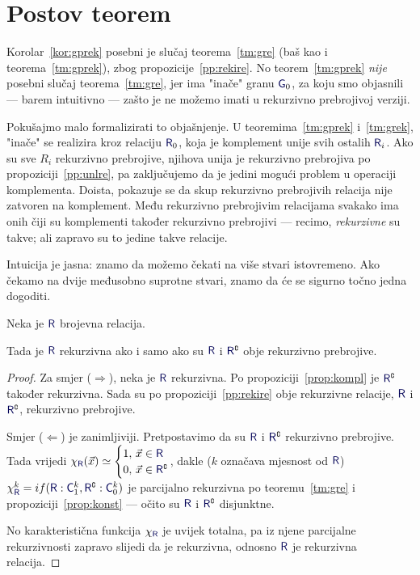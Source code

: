 \section{Postov teorem}\label{sec:Post}

Korolar~\ref{kor:gprek} posebni je slučaj teorema~\ref{tm:gre} (baš kao i teorema~\ref{tm:gprek}), zbog propozicije~\ref{pp:rekire}. No teorem~\ref{tm:gprek} \emph{nije} posebni slučaj teorema~\ref{tm:gre}, jer ima "inače" granu $\f G_0$, za koju smo objasnili --- barem intuitivno --- zašto je ne možemo imati u rekurzivno prebrojivoj verziji.

Pokušajmo malo formalizirati to objašnjenje. U teoremima~\ref{tm:gprek} i~\ref{tm:grek}, "inače" se realizira kroz relaciju $\f R_0$, koja je komplement unije svih ostalih $\f R_i$. Ako su sve $R_i$ rekurzivno prebrojive, njihova unija je rekurzivno prebrojiva po propoziciji~\ref{pp:unlre}, pa zaključujemo da je jedini mogući problem u operaciji komplementa. Doista, pokazuje se da skup rekurzivno prebrojivih relacija nije zatvoren na komplement. Među rekurzivno prebrojivim relacijama svakako ima onih čiji su komplementi također rekurzivno prebrojivi --- recimo, \emph{rekurzivne} su takve; ali zapravo su to jedine takve relacije.

Intuicija je jasna: znamo da možemo čekati na više stvari istovremeno. Ako čekamo na dvije međusobno suprotne stvari, znamo da će se sigurno točno jedna dogoditi.

\begin{teorem}\label{tm:Post}
Neka je $\f R$ brojevna relacija.

    Tada je $\f R$ rekurzivna ako i samo ako su $\f R$ i $\f R\kompl$ obje rekurzivno prebrojive.
\end{teorem}
\begin{proof}
Za smjer ($\Rightarrow$), neka je $\f R$ rekurzivna. Po propoziciji~\ref{prop:kompl} je $\f R\kompl$ također rekurzivna. Sada su po propoziciji~\ref{pp:rekire} obje rekurzivne relacije, $\f R$ i $\f R\kompl$, rekurzivno prebrojive.

Smjer ($\Leftarrow$) je zanimljiviji. Pretpostavimo da su $\f R$ i $\f R\kompl$ rekurzivno prebrojive. Tada vrijedi
$
    \chi_{\f R}(\vec x)\simeq\begin{cases}
    1,&\!\!\!\!\vec x\in\f R\\
    0,&\!\!\!\!\vec x\in\f R\kompl
    \end{cases}$\text,
dakle ($k$ označava mjesnost od $\f R$) $\chi^k_{\f R}=\IF{\f R:\f C_1^k,\f R\kompl:\f C_0^k}$ je parcijalno rekurzivna po teoremu~\ref{tm:gre} i propoziciji~\ref{prop:konst} --- očito su $\f R$ i $\f R\kompl$ disjunktne.

No karakteristična funkcija $\chi_{\f R}$ je uvijek totalna, pa iz njene parcijalne rekurzivnosti zapravo slijedi da je rekurzivna, odnosno $\f R$ je rekurzivna relacija.
\end{proof}

